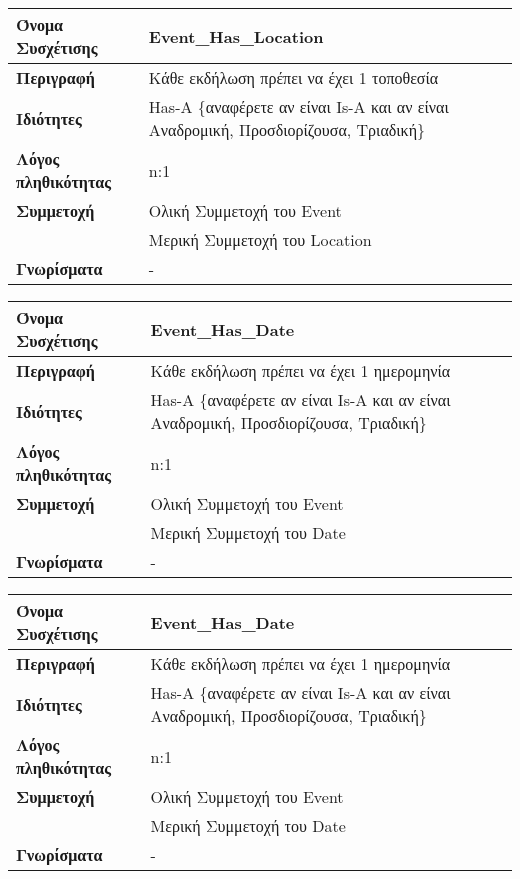\begin{tabular}[]{|p{4cm}|p{10cm}|}
  \hline
  \textbf{Όνομα Συσχέτισης} & Event\_Has\_Location\\ \hline
  \textbf{Περιγραφή} & Κάθε εκδήλωση πρέπει να έχει 1 τοποθεσία\\ \hline
  \textbf{Ιδιότητες} & Has-A \{αναφέρετε αν είναι Is-A και αν είναι
                       Αναδρομική, Προσδιορίζουσα, Τριαδική\} \\ \hline
  \textbf{Λόγος πληθικότητας} & n:1 \\ \hline
  \textbf{Συμμετοχή} & Ολική Συμμετοχή του Event \\ \cline{2-2}
                     & Μερική Συμμετοχή του Location \\ \hline
  \textbf{Γνωρίσματα} & - \\ \hline
\end{tabular}


\begin{tabular}[]{|p{4cm}|p{10cm}|}
  \hline
  \textbf{Όνομα Συσχέτισης} & Event\_Has\_Date\\ \hline
  \textbf{Περιγραφή} & Κάθε εκδήλωση πρέπει να έχει 1 ημερομηνία\\ \hline
  \textbf{Ιδιότητες} & Has-A \{αναφέρετε αν είναι Is-A και αν είναι
                       Αναδρομική, Προσδιορίζουσα, Τριαδική\} \\ \hline
  \textbf{Λόγος πληθικότητας} & n:1 \\ \hline
  \textbf{Συμμετοχή} & Ολική Συμμετοχή του Event \\ \cline{2-2}
                     & Μερική Συμμετοχή του Date \\ \hline
  \textbf{Γνωρίσματα} & - \\ \hline
\end{tabular}


\begin{tabular}[]{|p{4cm}|p{10cm}|}
  \hline
  \textbf{Όνομα Συσχέτισης} & Event\_Has\_Date\\ \hline
  \textbf{Περιγραφή} & Κάθε εκδήλωση πρέπει να έχει 1 ημερομηνία\\ \hline
  \textbf{Ιδιότητες} & Has-A \{αναφέρετε αν είναι Is-A και αν είναι
                       Αναδρομική, Προσδιορίζουσα, Τριαδική\} \\ \hline
  \textbf{Λόγος πληθικότητας} & n:1 \\ \hline
  \textbf{Συμμετοχή} & Ολική Συμμετοχή του Event \\ \cline{2-2}
                     & Μερική Συμμετοχή του Date \\ \hline
  \textbf{Γνωρίσματα} & - \\ \hline
\end{tabular}

